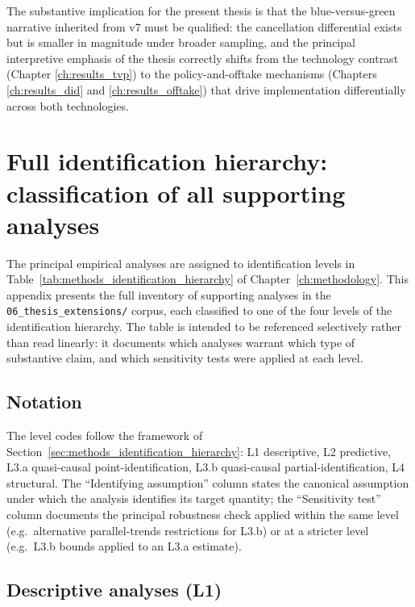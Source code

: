 The substantive implication for the present thesis is that the blue-versus-green narrative inherited from v7 must be qualified: the cancellation differential exists but is smaller in magnitude under broader sampling, and the principal interpretive emphasis of the thesis correctly shifts from the technology contrast (Chapter \ref{ch:results_tvp}) to the policy-and-offtake mechanisms (Chapters \ref{ch:results_did} and \ref{ch:results_offtake}) that drive implementation differentially across both technologies.


\section{Full identification hierarchy: classification of all supporting analyses}
\label{app:identification_table}

The principal empirical analyses are assigned to identification levels in Table~\ref{tab:methods_identification_hierarchy} of Chapter~\ref{ch:methodology}. This appendix presents the full inventory of supporting analyses in the \texttt{06\_thesis\_extensions/} corpus, each classified to one of the four levels of the identification hierarchy. The table is intended to be referenced selectively rather than read linearly: it documents which analyses warrant which type of substantive claim, and which sensitivity tests were applied at each level.

\subsection*{Notation}

The level codes follow the framework of Section~\ref{sec:methods_identification_hierarchy}: L1 descriptive, L2 predictive, L3.a quasi-causal point-identification, L3.b quasi-causal partial-identification, L4 structural. The ``Identifying assumption'' column states the canonical assumption under which the analysis identifies its target quantity; the ``Sensitivity test'' column documents the principal robustness check applied within the same level (e.g.\ alternative parallel-trends restrictions for L3.b) or at a stricter level (e.g.\ L3.b bounds applied to an L3.a estimate).

\subsection*{Descriptive analyses (L1)}

